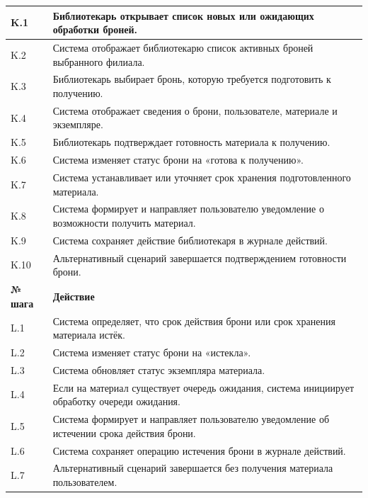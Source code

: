 \documentclass[12pt,a4paper]{article}
\begin{document}
\begin{xltabular}{\textwidth}{
				|>{\raggedright\arraybackslash}p{2.7cm}
				|>{\raggedright\arraybackslash}X|
			}
			K.1 & Библиотекарь открывает список новых или ожидающих обработки броней. \\
			\hline
			K.2 & Система отображает библиотекарю список активных броней выбранного
			филиала. \\
			\hline
			K.3 & Библиотекарь выбирает бронь, которую требуется подготовить к
			получению. \\
			\hline
			K.4 & Система отображает сведения о брони, пользователе, материале и
			экземпляре. \\
			\hline
			K.5 & Библиотекарь подтверждает готовность материала к получению. \\
			\hline
			K.6 & Система изменяет статус брони на «готова к получению». \\
			\hline
			K.7 & Система устанавливает или уточняет срок хранения подготовленного
			материала. \\
			\hline
			K.8 & Система формирует и направляет пользователю уведомление о
			возможности получить материал. \\
			\hline
			K.9 & Система сохраняет действие библиотекаря в журнале действий. \\
			\hline
			K.10 & Альтернативный сценарий завершается подтверждением готовности
			брони. \\
			\hline
			
			
			\textbf{№ шага} & \textbf{Действие} \\
			\hline
			
			L.1 & Система определяет, что срок действия брони или срок хранения
			материала истёк. \\
			\hline
			L.2 & Система изменяет статус брони на «истекла». \\
			\hline
			L.3 & Система обновляет статус экземпляра материала. \\
			\hline
			L.4 & Если на материал существует очередь ожидания, система инициирует
			обработку очереди ожидания. \\
			\hline
			L.5 & Система формирует и направляет пользователю уведомление об
			истечении срока действия брони. \\
			\hline
			L.6 & Система сохраняет операцию истечения брони в журнале действий. \\
			\hline
			L.7 & Альтернативный сценарий завершается без получения материала
			пользователем. \\
			\hline
			

\end{xltabular}
\end{document}
